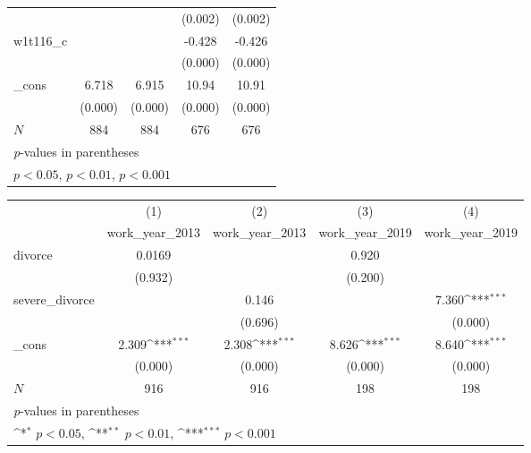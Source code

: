 {\begin{tabular}{l*{4}{c}}
            &                     &                     &     (0.002)         &     (0.002)         \\
[1em]
w1t116\_c    &                     &                     &      -0.428\sym{***}&      -0.426\sym{***}\\
            &                     &                     &     (0.000)         &     (0.000)         \\
[1em]
\_cons      &       6.718\sym{***}&       6.915\sym{***}&       10.94\sym{***}&       10.91\sym{***}\\
            &     (0.000)         &     (0.000)         &     (0.000)         &     (0.000)         \\
\hline
\(N\)       &         884         &         884         &         676         &         676         \\
\hline\hline
\multicolumn{5}{l}{\footnotesize \textit{p}-values in parentheses}\\
\multicolumn{5}{l}{\footnotesize \sym{*} \(p<0.05\), \sym{**} \(p<0.01\), \sym{***} \(p<0.001\)}\\
\end{tabular}
}
{
\def\sym#1{\ifmmode^{#1}\else\(^{#1}\)\fi}
\begin{tabular}{l*{4}{c}}
\hline\hline
            &\multicolumn{1}{c}{(1)}&\multicolumn{1}{c}{(2)}&\multicolumn{1}{c}{(3)}&\multicolumn{1}{c}{(4)}\\
            &\multicolumn{1}{c}{work\_year\_2013}&\multicolumn{1}{c}{work\_year\_2013}&\multicolumn{1}{c}{work\_year\_2019}&\multicolumn{1}{c}{work\_year\_2019}\\
\hline
divorce     &      0.0169         &                     &       0.920         &                     \\
            &     (0.932)         &                     &     (0.200)         &                     \\
[1em]
severe\_divorce&                     &       0.146         &                     &       7.360\sym{***}\\
            &                     &     (0.696)         &                     &     (0.000)         \\
[1em]
\_cons      &       2.309\sym{***}&       2.308\sym{***}&       8.626\sym{***}&       8.640\sym{***}\\
            &     (0.000)         &     (0.000)         &     (0.000)         &     (0.000)         \\
\hline
\(N\)       &         916         &         916         &         198         &         198         \\
\hline\hline
\multicolumn{5}{l}{\footnotesize \textit{p}-values in parentheses}\\
\multicolumn{5}{l}{\footnotesize \sym{*} \(p<0.05\), \sym{**} \(p<0.01\), \sym{***} \(p<0.001\)}\\
\end{tabular}
}
